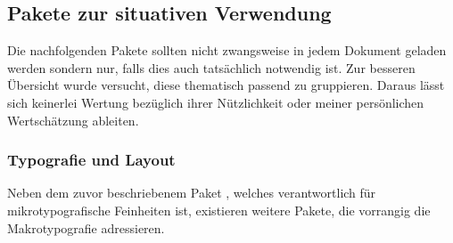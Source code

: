 


\subsection{Pakete zur situativen Verwendung}

Die nachfolgenden Pakete sollten nicht zwangsweise in jedem Dokument geladen 
werden sondern nur, falls dies auch tatsächlich notwendig ist. Zur besseren 
Übersicht wurde versucht, diese thematisch passend zu gruppieren. Daraus lässt 
sich keinerlei Wertung bezüglich ihrer Nützlichkeit oder meiner persönlichen 
Wertschätzung ableiten.



\subsubsection{%
  Typografie und Layout%
}

Neben dem zuvor beschriebenem Paket , welches verantwortlich 
für mikrotypografische Feinheiten ist, existieren weitere Pakete, die vorrangig 
die Makrotypografie adressieren.

